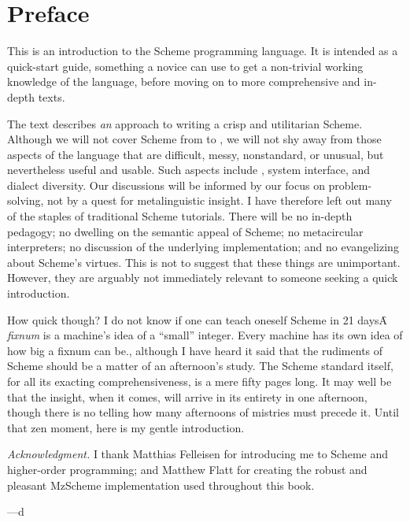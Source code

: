 \chapter*{Preface}

This is an introduction to the Scheme programming
language.  It is intended as a quick-start guide,
something a novice can use to get a non-trivial working
knowledge of the language, before moving on to more
comprehensive and in-depth texts.

The text describes {\em an} approach to writing a crisp
and utilitarian Scheme.  Although we will not cover
Scheme from  to , we will not shy away
from those aspects of the language that are difficult,
messy, nonstandard, or unusual, but nevertheless useful
and usable.  Such aspects include
, system
interface, and dialect diversity.   Our
discussions will be informed by our focus on
problem-solving, not by a quest for metalinguistic
insight.  I have therefore left out many of the staples
of traditional Scheme tutorials.  There will be no
in-depth pedagogy; no dwelling on the semantic appeal
of Scheme; no metacircular interpreters; no discussion
of the underlying implementation; 
and no evangelizing about Scheme’s virtues.  This is
not to suggest that these things are unimportant.
However, they are arguably not immediately relevant to
someone seeking a quick introduction.


How quick though?  I do not know if one can teach
oneself Scheme in 21 days\f{A {\em fixnum} is a
machine’s idea of a “small” integer.  Every machine
has its own idea of how big a fixnum can be.}, although
I have heard it said that the rudiments of Scheme
should be a matter of an afternoon’s study.  The Scheme
standard \cite{r5rs} itself, for all its exacting
comprehensiveness, is a mere fifty pages long.  It may
well be that the insight, when it comes, will arrive in
its entirety in one afternoon, though there is no
telling how many afternoons of mistries must precede
it.  Until that zen moment, here is my gentle
introduction.

{\em Acknowledgment.}  I thank Matthias Felleisen for
introducing me to Scheme and higher-order programming;
and Matthew Flatt for creating the robust and
pleasant MzScheme implementation used throughout this
book.

\texonly
\bigbreak
\endtexonly

—d

